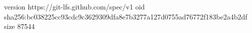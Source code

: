 version https://git-lfs.github.com/spec/v1
oid sha256:bc038225cc93cdc9c3629309dfa8e7b3277a127d0755ad76772f183be2a4b2df
size 87544
